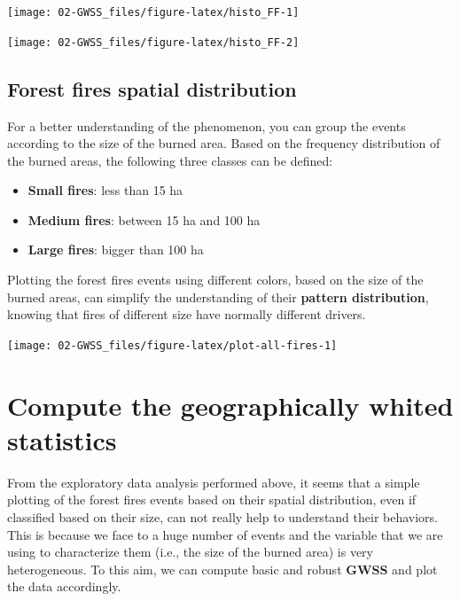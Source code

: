 \documentclass[
]{book}
\theoremstyle{definition}
\theoremstyle{definition}
\theoremstyle{definition}
\theoremstyle{definition}
\theoremstyle{remark}
\begin{document}
\begin{center}\texttt{[image: 02-GWSS\_files/figure-latex/histo\_FF-1]} \end{center}

\begin{center}\texttt{[image: 02-GWSS\_files/figure-latex/histo\_FF-2]} \end{center}

\hypertarget{forest-fires-spatial-distribution}{%
\subsection{Forest fires spatial distribution}\label{forest-fires-spatial-distribution}}

For a better understanding of the phenomenon, you can group the events according to the size of the burned area.
Based on the frequency distribution of the burned areas, the following three classes can be defined:

\begin{itemize}
\item
  \textbf{Small fires}: less than 15 ha
\item
  \textbf{Medium fires}: between 15 ha and 100 ha
\item
  \textbf{Large fires}: bigger than 100 ha
\end{itemize}

Plotting the forest fires events using different colors, based on the size of the burned areas, can simplify the understanding of their \textbf{pattern distribution}, knowing that fires of different size have normally different drivers.

\begin{center}\texttt{[image: 02-GWSS\_files/figure-latex/plot-all-fires-1]} \end{center}

\hypertarget{compute-the-geographically-whited-statistics}{%
\section{Compute the geographically whited statistics}\label{compute-the-geographically-whited-statistics}}

From the exploratory data analysis performed above, it seems that a simple plotting of the forest fires events based on their spatial distribution, even if classified based on their size, can not really help to understand their behaviors.
This is because we face to a huge number of events and the variable that we are using to characterize them (i.e., the size of the burned area) is very heterogeneous.
To this aim, we can compute basic and robust \textbf{GWSS} and plot the data accordingly.
\end{document}
